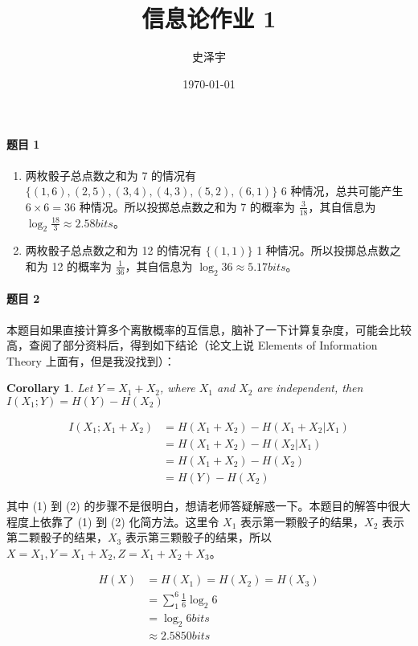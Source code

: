 \documentclass{ctexart}
\title{信息论作业 1}
\author{史泽宇}
\date{\today}
\newtheorem{cl}{Corollary}
\begin{document}
\maketitle

\paragraph{题目 1}
\begin{enumerate}
    \item 两枚骰子总点数之和为 7 的情况有 $\{(1, 6), (2, 5), (3, 4), (4, 3), (5, 2), (6, 1)\}$ 6 种情况，总共可能产生 $6 \times 6 = 36$ 种情况。所以投掷总点数之和为 7 的概率为 $\frac{3}{18}$，其自信息为 $\log_2\frac{18}{3} \approx 2.58 bits$。
    \item 两枚骰子总点数之和为 12 的情况有 $\{(1, 1)\}$ 1 种情况。所以投掷总点数之和为 12 的概率为 $\frac{1}{36}$，其自信息为 $\log_2 36 \approx 5.17 bits$。
\end{enumerate}

\paragraph{题目 2}
本题目如果直接计算多个离散概率的互信息，脑补了一下计算复杂度，可能会比较高，查阅了部分资料后\cite{madiman2008entropy}，得到如下结论（论文上说 Elements of Information Theory 上面有，但是我没找到）：

\begin{cl}
Let $Y = X_1 + X_2$, where $X_1$ and $X_2$ are independent, then $I(X_1; Y) = H(Y) - H(X_2)$
\end{cl}

\begin{align}
    I(X_1; X_1 + X_2) &= H(X_1 + X_2) - H(X_1 + X_2|X_1) \\
    &= H(X_1 + X_2) - H(X_2|X_1) \\
    &= H(X_1 + X_2) - H(X_2) \\
    &= H(Y) - H(X_2)
\end{align}

其中 (1) 到 (2) 的步骤不是很明白，想请老师答疑解惑一下。本题目的解答中很大程度上依靠了 (1) 到 (2) 化简方法。这里令 $X_1$ 表示第一颗骰子的结果，$X_2$ 表示第二颗骰子的结果，$X_3$ 表示第三颗骰子的结果，所以 $X = X_1, Y = X_1 + X_2, Z = X_1 + X_2 + X_3$。

\begin{align}
    H(X) &= H(X_1) = H(X_2) = H(X_3) \\
    &= \sum_1^6 \frac{1}{6}\log_2 6 \\
    &= \log_2 6 bits \\
    &\approx 2.5850 bits
\end{align}
\end{document}
